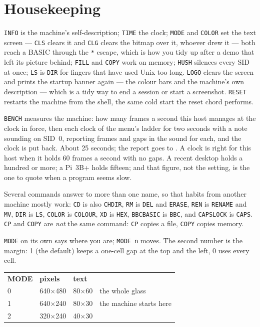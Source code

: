 \section{Housekeeping}
\verb|INFO| is the machine's self-description; \verb|TIME| the clock;
\verb|MODE| and \verb|COLOR| set the text screen --- \verb|CLS| clears it and
\verb|CLG| clears the bitmap over it, whoever drew it --- both reach a
BASIC through the \texttt{*} escape, which is how you tidy up after a demo
that left its picture behind; \verb|FILL| and
\verb|COPY| work on memory; \verb|HUSH| silences every SID at once;
\verb|LS| is \verb|DIR| for fingers that have used Unix too long.
\verb|LOGO| clears the screen and prints the startup banner again ---
the colour bars and the machine's own description --- which is a tidy way
to end a session or start a screenshot.
\verb|RESET| restarts the machine from the shell, the same cold start the
reset chord performs.

\verb|BENCH| measures the machine: how many frames a second this host
manages at the clock in force, then each clock of the menu's ladder for
two seconds with a note sounding on SID~0, reporting frames and gaps in the
sound for each, and the clock is put back. About 25 seconds; the report
goes to . A clock is right for this host when
it holds 60 frames a second with no gaps. A recent desktop holds a
hundred or more; a Pi~3B+ holds fifteen; and that figure, not the
setting, is the one to quote when a program seems slow.

Several commands answer to more than one name, so that habits from
another machine mostly work: \verb|CD| is also \verb|CHDIR|, \verb|RM|
is \verb|DEL| and \verb|ERASE|, \verb|REN| is \verb|RENAME| and
\verb|MV|, \verb|DIR| is \verb|LS|, \verb|COLOR| is \verb|COLOUR|,
\verb|XD| is \verb|HEX|, \verb|BBCBASIC| is \verb|BBC|, and
\verb|CAPSLOCK| is \verb|CAPS|. \verb|CP| and \verb|COPY| are
\emph{not} the same command: \verb|CP| copies a file, \verb|COPY|
copies memory.

\verb|MODE| on its own says where you are; \verb|MODE n| moves. The second
number is the margin: 1 (the default) keeps a one-cell gap at the top and
the left, 0 uses every cell.

\begin{tabular}{llll}
\textbf{MODE} & \textbf{pixels} & \textbf{text} & \\
0 & 640$\times$480 & 80$\times$60 & the whole glass \\
1 & 640$\times$240 & 80$\times$30 & the machine starts here \\
2 & 320$\times$240 & 40$\times$30 & \\
\end{tabular}

